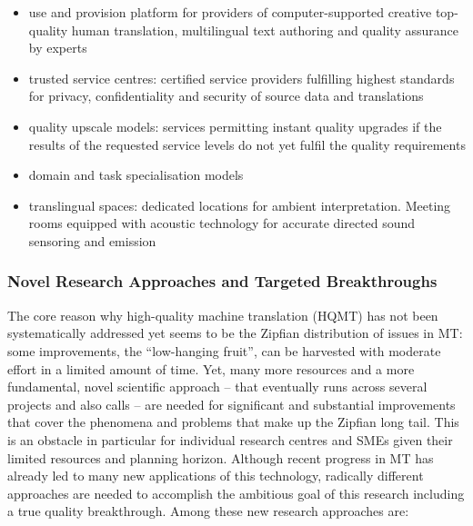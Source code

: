 \documentclass[10pt, plain]{../../metanetpaper}
\begin{document}
\begin{multicols}{2}
\begin{itemize}
\item use and provision platform for providers of computer-supported creative top-quality human translation, multilingual text authoring and quality assurance by experts
\item trusted service centres: certified service providers fulfilling highest standards for privacy, confidentiality and security of source data and translations
\item quality upscale models: services permitting instant quality upgrades if the results of the requested service levels do not yet fulfil the quality requirements
\item domain and task specialisation models
\item translingual spaces: dedicated locations for ambient interpretation. Meeting rooms equipped with acoustic technology for accurate directed sound sensoring and emission
\end{itemize}

\subsubsection{Novel Research Approaches and Targeted Breakthroughs}
\label{sec:novel-rese-appr-pt1}

The core reason why high-quality machine translation (HQMT) has not been systematically addressed yet seems to be the Zipfian distribution of issues in MT: some improvements, the “low-hanging fruit”, can be harvested with moderate effort in a limited amount of time. Yet, many more resources and a more fundamental, novel scientific approach -- that eventually runs across several projects and also calls -- are needed for significant and substantial improvements that cover the phenomena and problems that make up the Zipfian long tail. This is an obstacle in particular for individual research centres and SMEs given their limited resources and planning horizon. Although recent progress in MT has already led to many new applications of this technology, radically different approaches are needed to accomplish the ambitious goal of this research including a true quality breakthrough. Among these new research approaches are:


\end{multicols}
\end{document}
